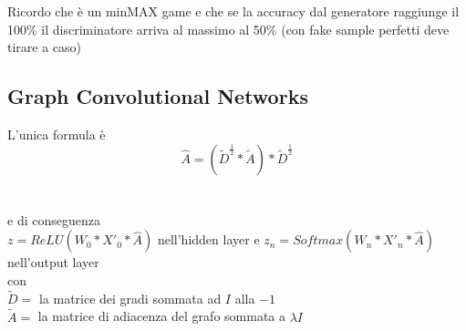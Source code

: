 \documentclass[]{article}
\begin{document}
Ricordo che è un minMAX game e che se la accuracy dal generatore raggiunge il 100\% il discriminatore arriva al massimo al 50\% (con fake sample perfetti deve tirare a caso)



\subsection{Graph Convolutional Networks}
L'unica formula è\\
\[ \hat{A} = (\tilde{D}^{\frac{1}{2}}*\tilde{A})*\tilde{D}^{\frac{1}{2}} \] \\ \\
e di conseguenza\\
$ z = ReLU(W_0*X'_0*\hat{A} ) $ nell'hidden layer e $ z_n = Softmax(W_n*X'_{n}*\hat{A} ) $ nell'output layer\\

con \\ 
$\tilde{D} = $ la matrice dei gradi sommata ad $I$ alla $-1$ \\
$\tilde{A} = $ la matrice di adiacenza del grafo sommata a $\lambda I$\\
\end{document}
